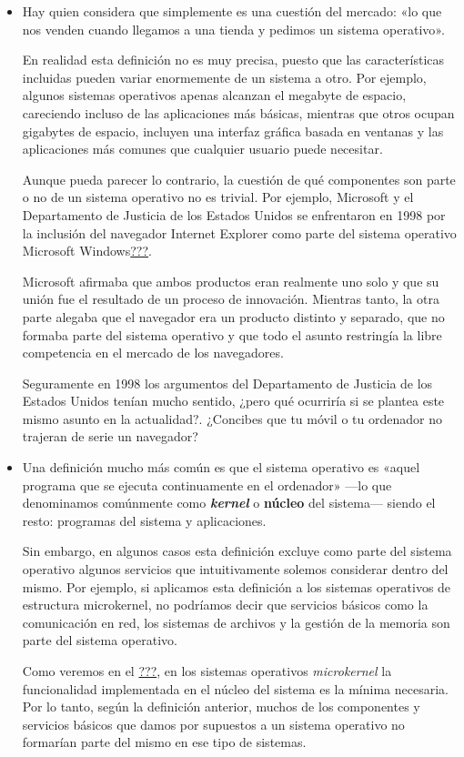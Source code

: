 \begin{itemize}
\item
  Hay quien considera que simplemente es una cuestión del mercado: «lo
  que nos venden cuando llegamos a una tienda y pedimos un sistema
  operativo».

  En realidad esta definición no es muy precisa, puesto que las
  características incluidas pueden variar enormemente de un sistema a
  otro. Por ejemplo, algunos sistemas operativos apenas alcanzan el
  megabyte de espacio, careciendo incluso de las aplicaciones más
  básicas, mientras que otros ocupan gigabytes de espacio, incluyen una
  interfaz gráfica basada en ventanas y las aplicaciones más comunes que
  cualquier usuario puede necesitar.

  Aunque pueda parecer lo contrario, la cuestión de qué componentes son
  parte o no de un sistema operativo no es trivial. Por ejemplo,
  Microsoft y el Departamento de Justicia de los Estados Unidos se
  enfrentaron en 1998 por la inclusión del navegador Internet Explorer
  como parte del sistema operativo Microsoft
  Windows\hyperref[Wikipedia-CaseUsaVsMicrosoft]{???}.

  Microsoft afirmaba que ambos productos eran realmente uno solo y que
  su unión fue el resultado de un proceso de innovación. Mientras tanto,
  la otra parte alegaba que el navegador era un producto distinto y
  separado, que no formaba parte del sistema operativo y que todo el
  asunto restringía la libre competencia en el mercado de los
  navegadores.

  Seguramente en 1998 los argumentos del Departamento de Justicia de los
  Estados Unidos tenían mucho sentido, ¿pero qué ocurriría si se plantea
  este mismo asunto en la actualidad?. ¿Concibes que tu móvil o tu
  ordenador no trajeran de serie un navegador?
\item
  Una definición mucho más común es que el sistema operativo es «aquel
  programa que se ejecuta continuamente en el ordenador» ---lo que
  denominamos comúnmente como \emph{\textbf{{}kernel}} o
  \textbf{{}núcleo} del sistema--- siendo el resto: programas del
  sistema y aplicaciones.

  Sin embargo, en algunos casos esta definición excluye como parte del
  sistema operativo algunos servicios que intuitivamente solemos
  considerar dentro del mismo. Por ejemplo, si aplicamos esta definición
  a los sistemas operativos de estructura microkernel, no podríamos
  decir que servicios básicos como la comunicación en red, los sistemas
  de archivos y la gestión de la memoria son parte del sistema
  operativo.

  Como veremos en el \hyperref[_microkernel]{???}, en los sistemas
  operativos \emph{microkernel} la funcionalidad implementada en el
  núcleo del sistema es la mínima necesaria. Por lo tanto, según la
  definición anterior, muchos de los componentes y servicios básicos que
  damos por supuestos a un sistema operativo no formarían parte del
  mismo en ese tipo de sistemas.
\end{itemize}

